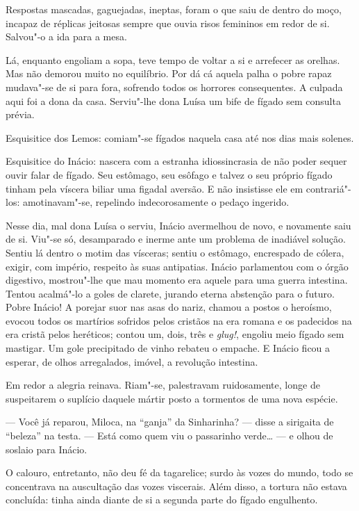 Respostas mascadas, gaguejadas, ineptas, foram o que saiu de dentro do
moço, incapaz de réplicas jeitosas sempre que ouvia risos femininos em
redor de si. Salvou"-o a ida para a mesa.

Lá, enquanto engoliam a sopa, teve tempo de voltar a si e arrefecer as
orelhas. Mas não demorou muito no equilíbrio. Por dá cá aquela palha o
pobre rapaz mudava"-se de si para fora, sofrendo todos os horrores
consequentes. A culpada aqui foi a dona da casa. Serviu"-lhe dona Luísa
um bife de fígado sem consulta prévia.

Esquisitice dos Lemos: comiam"-se fígados naquela casa até nos dias mais
solenes.

Esquisitice do Inácio: nascera com a estranha idiossincrasia de não
poder sequer ouvir falar de fígado. Seu estômago, seu esôfago e talvez o
seu próprio fígado tinham pela víscera biliar uma figadal aversão. E não
insistisse ele em contrariá"-los: amotinavam"-se, repelindo
indecorosamente o pedaço ingerido.

Nesse dia, mal dona Luísa o serviu, Inácio avermelhou de novo, e
novamente saiu de si. Viu"-se só, desamparado e inerme ante um problema
de inadiável solução. Sentiu lá dentro o motim das vísceras; sentiu o
estômago, encrespado de cólera, exigir, com império, respeito às suas
antipatias. Inácio parlamentou com o órgão digestivo, mostrou"-lhe que
mau momento era aquele para uma guerra intestina. Tentou acalmá"-lo a
goles de clarete, jurando eterna abstenção para o futuro. Pobre Inácio!
A porejar suor nas asas do nariz, chamou a postos o heroísmo, evocou
todos os martírios sofridos pelos cristãos na era romana e os padecidos
na era cristã pelos heréticos; contou um, dois, três e \emph{glug!},
engoliu meio fígado sem mastigar. Um gole precipitado de vinho rebateu o
empache. E Inácio ficou a esperar, de olhos arregalados, imóvel, a
revolução intestina.

Em redor a alegria reinava. Riam"-se, palestravam ruidosamente, longe de
suspeitarem o suplício daquele mártir posto a tormentos de uma nova
espécie.

--- Você já reparou, Miloca, na ``ganja'' da Sinharinha? --- disse a
sirigaita de ``beleza'' na testa. --- Está como quem viu o passarinho
verde\ldots{} --- e olhou de soslaio para Inácio.

O calouro, entretanto, não deu fé da tagarelice; surdo às vozes do
mundo, todo se concentrava na auscultação das vozes viscerais. Além
disso, a tortura não estava concluída: tinha ainda diante de si a
segunda parte do fígado engulhento.

